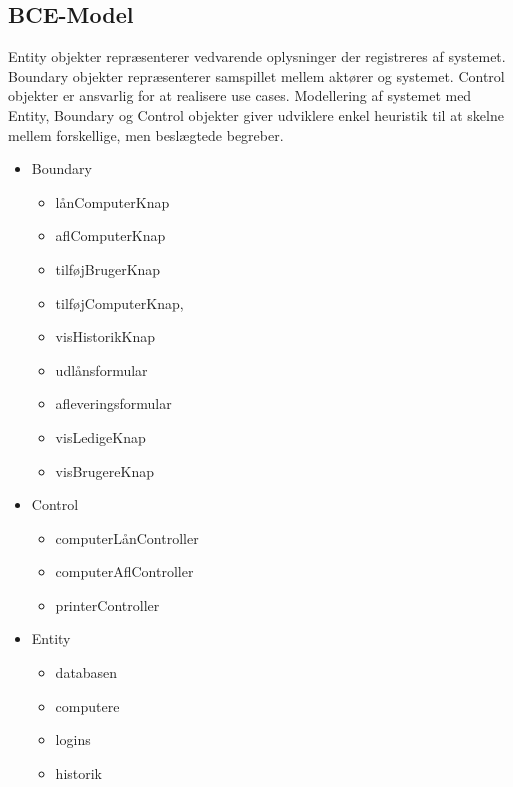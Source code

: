 \documentclass[a4paper]{article}
\begin{document}
\subsection{BCE-Model}
Entity objekter repræsenterer vedvarende oplysninger der registreres af systemet. Boundary objekter repræsenterer samspillet mellem aktører og systemet. Control objekter er ansvarlig for at realisere use cases. Modellering af systemet med Entity, Boundary og Control objekter giver udviklere enkel heuristik til at skelne mellem forskellige, men beslægtede begreber.\cite[p~171]{OOSE}
\begin{itemize}
	\item Boundary
	\begin{itemize}
		\item lånComputerKnap 
		\item aflComputerKnap 
		\item tilføjBrugerKnap 
		\item tilføjComputerKnap, 
		\item visHistorikKnap 
		\item udlånsformular 
		\item afleveringsformular 
		\item visLedigeKnap 
		\item visBrugereKnap
	\end{itemize}
	\item Control
	\begin{itemize} 
		\item computerLånController 
		\item computerAflController 
		\item printerController
	\end{itemize}
	\item Entity
	\begin{itemize} 
		\item databasen 
		\item computere 
		\item logins 
		\item historik
	\end{itemize}
\end{itemize}
\newpage
\end{document}
